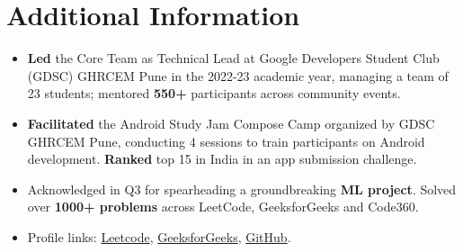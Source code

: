 \documentclass[letterpaper,11pt]{article}
\newcommand{\resumeItem}[1]{
  \item\small{
	{#1 \vspace{-3pt}}
  }
}
\begin{document}
\section{Additional Information}
 \begin{itemize}[leftmargin=0.15in, label={}]
    	\resumeItem{\textbf{Led} the Core Team as Technical Lead at Google Developers Student Club (GDSC) GHRCEM Pune in the 2022-23 academic year, managing a team of 23 students; mentored \textbf{550+} participants across community events.}
    	\resumeItem{\textbf{Facilitated} the Android Study Jam Compose Camp organized by GDSC GHRCEM Pune, conducting 4 sessions to train participants on Android development. \textbf{Ranked} top 15 in India in an app submission challenge.}
    	\resumeItem{Acknowledged in Q3 for spearheading a groundbreaking \textbf{ML project}. Solved over \textbf{1000+ problems} across LeetCode, GeeksforGeeks and Code360.}
        \resumeItem{Profile links: \href{https://leetcode.com/u/rg-incognito/}{Leetcode}, \href{https://www.geeksforgeeks.org/user/rohitrohit0705/}{GeeksforGeeks}, \href{https://github.com/rg-incognito/}{GitHub}.}
 \end{itemize}
 \vspace{-16pt}
\end{document}
